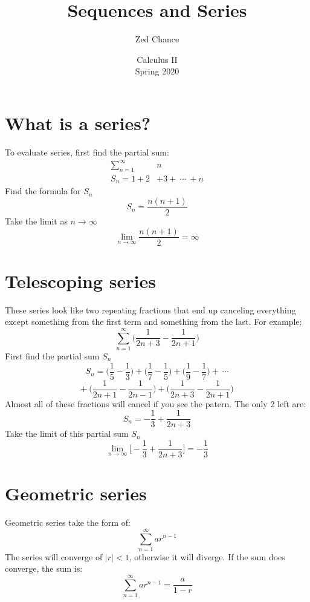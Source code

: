\documentclass{article}
\title{Sequences and Series}
\date{Calculus II\\Spring 2020}
\author{Zed Chance}
\begin{document}
\maketitle
\tableofcontents
\newpage

\section{What is a series?}
    To evaluate series, first find the partial sum:
    \begin{align*}
        \sum_{n=1}^\infty & n \\
        S_n = 1 +  2 & + 3 +\  \cdots \  + n
    \end{align*}
    Find the formula for \(S_n\)
    \[S_n= \frac{n(n+1)}{2}\]
    Take the limit as \(n \rightarrow \infty\)
    \[\lim_{n \rightarrow \infty} \frac{n(n+1)}{2} = \infty\]

\section{Telescoping series}
    These series look like two repeating fractions that end up canceling everything except something from the first term and something from the last. For example:
    \[\sum_{n=1}^{\infty} \Big (\frac{1}{2n+3} - \frac{1}{2n+1}\Big )\]
    First find the partial sum \(S_n\)
    \[S_n = \Big ( \frac{1}{5}-\frac{1}{3}\Big ) + \Big ( \frac{1}{7}-\frac{1}{5}\Big ) + \Big ( \frac{1}{9}-\frac{1}{7}\Big ) + \ \cdots \]
    \[+\ \Big ( \frac{1}{2n+1}-\frac{1}{2n-1}\Big ) + \Big ( \frac{1}{2n+3}-\frac{1}{2n+1}\Big )\]
    Almost all of these fractions will cancel if you see the patern. The only 2 left are:
    \[S_n = - \frac{1}{3} + \frac{1}{2n+3}\]
    Take the limit of this partial sum \(S_n\)
    \[\lim_{n \rightarrow \infty}\big[ - \frac{1}{3} + \frac{1}{2n+3} \big] = - \frac{1}{3}\]

\section{Geometric series}
    Geometric series take the form of:
    \[\sum_{n=1}^\infty ar^{n-1}\]
    The series will converge of \(\big|r\big|< 1\), otherwise it will diverge.
    If the sum does converge, the sum is:
    \[\sum_{n=1}^\infty ar^{n-1} = \frac{a}{1-r}\]
\end{document}
